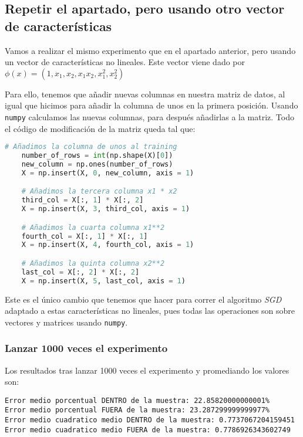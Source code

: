 \documentclass[11pt]{article}
\begin{document}
\subsection{Repetir el apartado, pero usando otro vector de características}

Vamos a realizar el mismo experimento que en el apartado anterior, pero usando un vector de características no lineales. Este vector viene dado por $\phi(x) = (1, x_1, x_2, x_1 x_2, x_1^2, x_2^2)$

Para ello, tenemos que añadir nuevas columnas en nuestra matriz de datos, al igual que hicimos para añadir la columna de unos en la primera posición. Usando \lstinline{numpy} calculamos las nuevas columnas, para después añadirlas a la matriz. Todo el código de modificación de la matriz queda tal que:

\begin{lstlisting}[language=Python]
    # Añadimos la columna de unos al training
    number_of_rows = int(np.shape(X)[0])
    new_column = np.ones(number_of_rows)
    X = np.insert(X, 0, new_column, axis = 1)

    # Añadimos la tercera columna x1 * x2
    third_col = X[:, 1] * X[:, 2]
    X = np.insert(X, 3, third_col, axis = 1)

    # Añadimos la cuarta columna x1**2
    fourth_col = X[:, 1] * X[:, 1]
    X = np.insert(X, 4, fourth_col, axis = 1)

    # Añadimos la quinta columna x2**2
    last_col = X[:, 2] * X[:, 2]
    X = np.insert(X, 5, last_col, axis = 1)
\end{lstlisting}

Este es el único cambio que tenemos que hacer para correr el algoritmo \emph{SGD} adaptado a estas características no lineales, pues todas las operaciones son sobre vectores y matrices usando \lstinline{numpy}.

\subsubsection{Lanzar 1000 veces el experimento}

Los resultados tras lanzar 1000 veces el experimento y promediando los valores son:

\begin{lstlisting}
Error medio porcentual DENTRO de la muestra: 22.85820000000001%
Error medio porcentual FUERA de la muestra: 23.287299999999977%
Error medio cuadratico medio DENTRO de la muestra: 0.7737067204159451
Error medio cuadratico medio FUERA de la muestra: 0.7786926343602749
\end{lstlisting}
\end{document}
